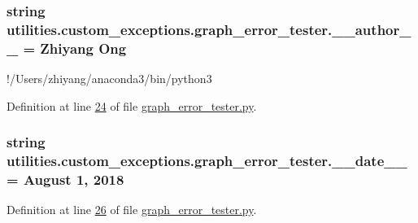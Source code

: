 \subsubsection[{\+\_\+\+\_\+author\+\_\+\+\_\+}]{\setlength{\rightskip}{0pt plus 5cm}string utilities.\+custom\+\_\+exceptions.\+graph\+\_\+error\+\_\+tester.\+\_\+\+\_\+author\+\_\+\+\_\+ = \textquotesingle{}Zhiyang Ong\textquotesingle{}}\label{namespaceutilities_1_1custom__exceptions_1_1graph__error__tester_a3dfce4d30766c0501517e21f0f7d81c8}


!/\+Users/zhiyang/anaconda3/bin/python3 



Definition at line \hyperlink{graph__error__tester_8py_source_l00024}{24} of file \hyperlink{graph__error__tester_8py_source}{graph\+\_\+error\+\_\+tester.\+py}.

\hypertarget{namespaceutilities_1_1custom__exceptions_1_1graph__error__tester_aa140a2b3da93c2d18ff00df34291a231}{}
\subsubsection[{\+\_\+\+\_\+date\+\_\+\+\_\+}]{\setlength{\rightskip}{0pt plus 5cm}string utilities.\+custom\+\_\+exceptions.\+graph\+\_\+error\+\_\+tester.\+\_\+\+\_\+date\+\_\+\+\_\+ = \textquotesingle{}August 1, 2018\textquotesingle{}}\label{namespaceutilities_1_1custom__exceptions_1_1graph__error__tester_aa140a2b3da93c2d18ff00df34291a231}


Definition at line \hyperlink{graph__error__tester_8py_source_l00026}{26} of file \hyperlink{graph__error__tester_8py_source}{graph\+\_\+error\+\_\+tester.\+py}.

\hypertarget{namespaceutilities_1_1custom__exceptions_1_1graph__error__tester_a0737f017d717d1aa08ae05d54ae5a491}{}
